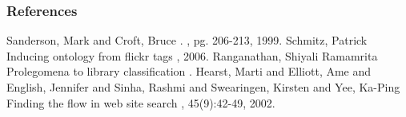 \documentclass{beamer}
\begin{document}
\begin{frame}
\tiny
    \frametitle{References}
  \begin{thebibliography}{10}    
  \beamertemplatebookbibitems
  Sanderson, Mark and Croft, Bruce
    .
    , pg. 206-213, 1999.
  \beamertemplatearticlebibitems
  Schmitz, Patrick
    \newblock Inducing ontology from flickr tags
    , 2006.
  \beamertemplatearticlebibitems
  Ranganathan, Shiyali Ramamrita
    \newblock Prolegomena to library classification
    .
  \beamertemplatearticlebibitems
  Hearst, Marti and Elliott, Ame and English, Jennifer and Sinha, Rashmi and Swearingen, Kirsten and Yee, Ka-Ping
    \newblock Finding the flow in web site search
    , 45(9):42-49, 2002.
  \end{thebibliography}
\end{frame}
\end{document}
